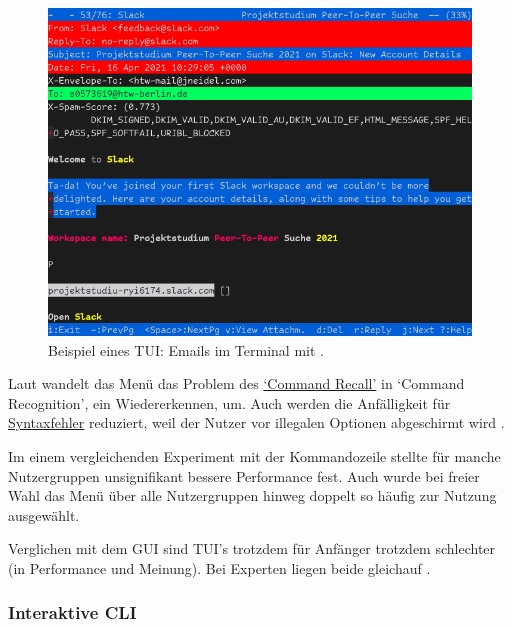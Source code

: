 \documentclass[oneside,bibliography=totocnumbered,BCOR=5mm]{scrbook}
\begin{document}
\begin{figure}[H]
  \centering
  \includegraphics[scale=.47]{menu-example.png}
  \caption{Beispiel eines TUI: Emails im Terminal mit .}
  \label{fig:menu-example}
\end{figure}

Laut \textcite{Paap_1988} wandelt das Menü das Problem des
\hyperref[prob:cr]{`Command Recall'} in `Command
Recognition', ein Wiedererkennen, um. Auch werden die Anfälligkeit für
\hyperref[prob:ss]{Syntaxfehler} reduziert, weil der Nutzer vor
illegalen Optionen abgeschirmt wird \parencite{Kantorowitz_1989}.

Im einem vergleichenden Experiment mit der Kommandozeile stellte
\textcite{Westerman_1997} für manche Nutzergruppen unsignifikant bessere Performance
fest. Auch wurde bei freier Wahl das Menü über alle Nutzergruppen hinweg doppelt
so häufig zur Nutzung ausgewählt.

Verglichen mit dem GUI sind TUI's trotzdem für Anfänger trotzdem schlechter
(in Performance und Meinung). Bei Experten liegen beide gleichauf
\parencite{tuivsgui}.

\subsubsection{Interaktive CLI}
\label{sec:def-interactive}
\end{document}
